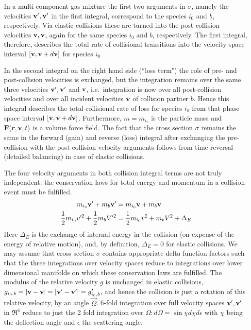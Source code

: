 In a multi-component gas mixture the first two arguments in $\sigma$, namely
the velocities $\mathbf{v}',\mathbf{v}'$ in the first integral, correspond to the species
$i_0$ and $b$, respectively.
Via elastic collisions these are turned into the post-collision velocities
$\mathbf{v}, \mathbf{v}$, again for the same species $i_0$ and $b$, respectively.
The first integral, therefore, describes the total rate of collisional
transitions into the velocity space interval $[\mathbf{v},\mathbf{v}+d\mathbf{v}]$ for species $i_0$

In the second integral on the right hand side (``loss term") the role of pre-
and post-collision velocities is exchanged, but the integration remains over
the same three velocities $\mathbf{v}',\mathbf{v}'$ and $\mathbf{v}$, i.e.\ integration is now over
all post-collision velocities and over all incident velocities $\mathbf{v}$ of
collision partner $b$.
Hence this integral describes the total collisional rate of loss for species
$i_0$ from that phase space interval $[\mathbf{v},\mathbf{v}+d\mathbf{v}]$.
Furthermore, $m = m_{i_0}$ is the particle mass and $\mathbf{F}(\mathbf{r},\mathbf{v},t)$ is a
volume force field.
The fact that the cross section $\sigma$ remains the same in the forward (gain)
and reverse (loss) integral after exchanging the pre-collision with the
post-collision velocity arguments follows from time-reversal (detailed
balancing) in case of elastic collisions.

The four velocity arguments in both collision integral terms are not truly
independent:
the conservation laws for total energy and
momentum in a collision event must be fulfilled.
\begin{align}
  \label{massenergy}
  m_{i_0} \mathbf{v}' + m_b\mathbf{v}'             & = m_{i_0}\mathbf{v} + m_b \mathbf{v} \nonumber
  \\
  \frac12 m_{i_0}v'^2+\frac12m_bV'^2 & =\frac12 m_{i_0}v^2 + m_b V^2 +\Delta_E
\end{align}
Here $\Delta_E$ is the exchange of internal energy in the collision (on expense
of the energy of relative motion), and, by definition, $\Delta_E = 0$ for
elastic collisions.
We may assume that cross section $\sigma$ contains appropriate delta function
factors such that the three integrations over velocity spaces reduce to
integrations over lower dimensional manifolds on which these conservation laws
are fulfilled.
The modulus of the relative velocity $g$ is unchanged in elastic collisions,
$g_{i_0,b} = |\mathbf{v}-\mathbf{v}| = |\mathbf{v}'-\mathbf{v}'| = g_{i_0,b}'$, and hence the collision is
just a rotation of this relative velocity, by an angle $\vec\Omega$.
6-fold integration over full velocity spaces $\mathbf{v}', \mathbf{v}'$ in $\Re^6$ reduce to
just the 2 fold integration over $\Omega:  d\Omega=\sin\chi d\chi d\epsilon$
with $\chi$ being the deflection angle and $\epsilon$ the scattering angle.

